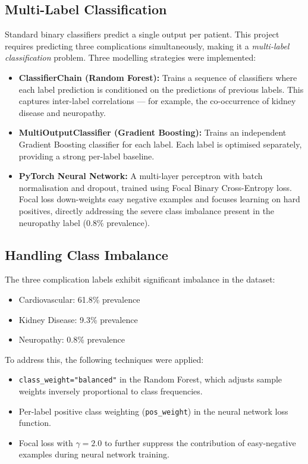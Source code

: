 \documentclass[12pt]{article}
\begin{document}
\subsection{Multi-Label Classification}

Standard binary classifiers predict a single output per patient. This project requires
predicting three complications simultaneously, making it a \textit{multi-label
classification} problem. Three modelling strategies were implemented:

\begin{itemize}
  \item \textbf{ClassifierChain (Random Forest):} Trains a sequence of classifiers where
        each label prediction is conditioned on the predictions of previous labels. This
        captures inter-label correlations --- for example, the co-occurrence of kidney
        disease and neuropathy.

  \item \textbf{MultiOutputClassifier (Gradient Boosting):} Trains an independent
        Gradient Boosting classifier for each label. Each label is optimised separately,
        providing a strong per-label baseline.

  \item \textbf{PyTorch Neural Network:} A multi-layer perceptron with batch
        normalisation and dropout, trained using Focal Binary Cross-Entropy loss. Focal
        loss down-weights easy negative examples and focuses learning on hard positives,
        directly addressing the severe class imbalance present in the neuropathy label
        (0.8\% prevalence).
\end{itemize}

\subsection{Handling Class Imbalance}

The three complication labels exhibit significant imbalance in the dataset:

\begin{itemize}
  \item Cardiovascular: 61.8\% prevalence
  \item Kidney Disease: 9.3\% prevalence
  \item Neuropathy: 0.8\% prevalence
\end{itemize}

To address this, the following techniques were applied:

\begin{itemize}
  \item \texttt{class\_weight="balanced"} in the Random Forest, which adjusts sample
        weights inversely proportional to class frequencies.
  \item Per-label positive class weighting (\texttt{pos\_weight}) in the neural network
        loss function.
  \item Focal loss with $\gamma = 2.0$ to further suppress the contribution of
        easy-negative examples during neural network training.
\end{itemize}
\end{document}
